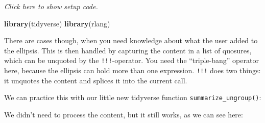 \documentclass[]{book}
\newenvironment{Shaded}{\begin{snugshade}}{\end{snugshade}}
\newcommand{\CommentTok}[1]{\textcolor[rgb]{0.56,0.35,0.01}{\textit{#1}}}
\newcommand{\ControlFlowTok}[1]{\textcolor[rgb]{0.13,0.29,0.53}{\textbf{#1}}}
\newcommand{\DataTypeTok}[1]{\textcolor[rgb]{0.13,0.29,0.53}{#1}}
\newcommand{\KeywordTok}[1]{\textcolor[rgb]{0.13,0.29,0.53}{\textbf{#1}}}
\newcommand{\NormalTok}[1]{#1}
\newcommand{\OperatorTok}[1]{\textcolor[rgb]{0.81,0.36,0.00}{\textbf{#1}}}
\newcommand{\OtherTok}[1]{\textcolor[rgb]{0.56,0.35,0.01}{#1}}
\newcommand{\StringTok}[1]{\textcolor[rgb]{0.31,0.60,0.02}{#1}}
\begin{document}
\emph{Click here to show setup code.}

\begin{Shaded}
\begin{Highlighting}[]
\KeywordTok{library}\NormalTok{(tidyverse)}
\KeywordTok{library}\NormalTok{(rlang)}
\end{Highlighting}
\end{Shaded}

There are cases though, when you need knowledge about what the user added to the ellipsis.
This is then handled by capturing the content in a list of quosures, which can be unquoted by the \texttt{!!!}-operator.
You need the ``triple-bang'' operator here, because the ellipsis can hold more than one expression.
\texttt{!!!} does two things: it unquotes the content and splices it into the current call.

We can practice this with our little new tidyverse function \texttt{summarize\_ungroup()}:

\begin{Shaded}
\end{Shaded}

We didn't need to process the content, but it still works, as we can see here:

\begin{Shaded}
\end{Shaded}
\end{document}
